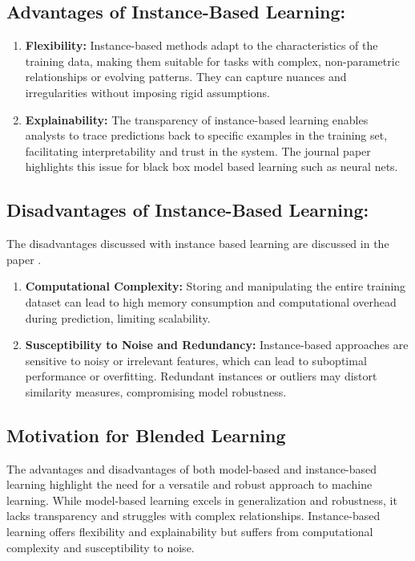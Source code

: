\documentclass[a4paper, 12pt]{report}
\begin{document}
\subsection{Advantages of Instance-Based Learning:}
\begin{enumerate}
	\item \textbf{Flexibility:} Instance-based methods adapt to the characteristics of the training data, making them suitable for tasks with complex, non-parametric relationships or evolving patterns.
	      They can capture nuances and irregularities without imposing rigid assumptions.
	\item \textbf{Explainability:} The transparency of instance-based learning enables analysts to trace predictions back 
    to specific examples in the training set, facilitating interpretability and trust in the system. 
    The journal paper \cite{rudin2019stop} highlights this issue for black box model based learning such as neural nets.
\end{enumerate}

\subsection{Disadvantages of Instance-Based Learning:}
The disadvantages discussed with instance based learning are discussed in the paper \cite{aha1991instance}.
\begin{enumerate}
	\item \textbf{Computational Complexity:} Storing and manipulating the entire training dataset can lead to high memory consumption and computational overhead during prediction, limiting scalability.
	\item \textbf{Susceptibility to Noise and Redundancy:} Instance-based approaches are sensitive to noisy or irrelevant features, which can lead to suboptimal performance or overfitting. Redundant instances or outliers may distort similarity measures, compromising model robustness.
\end{enumerate}

\subsection{Motivation for Blended Learning}

The advantages and disadvantages of both model-based and instance-based learning highlight the need for a versatile and robust approach to machine learning.
While model-based learning excels in generalization and robustness, it lacks transparency and struggles with complex relationships.
Instance-based learning offers flexibility and explainability but suffers from computational complexity and susceptibility to noise.
\end{document}
